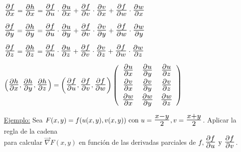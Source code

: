 \documentclass[10pt, titlepage]{article}
\newcommand{\bfrac}[2]{\scalebox{1.4}{$\frac{#1}{#2}$}}
\begin{document}
$\bfrac{\partial f}{\partial x} = \bfrac{\partial h}{\partial x} = \bfrac{\partial f}{\partial u} \cdot \bfrac{
\partial u}{\partial x} + \bfrac{\partial f}{\partial v} \cdot \bfrac{\partial v}{\partial x} + \bfrac{\partial f} 
{\partial w} \cdot \bfrac{\partial w}{\partial x}$
\vspace{3mm}

$\bfrac{\partial f}{\partial y} = \bfrac{\partial h}{\partial y} = \bfrac{\partial f}{\partial u} \cdot \bfrac{
\partial u}{\partial y} + \bfrac{\partial f}{\partial v} \cdot \bfrac{\partial v}{\partial y} + \bfrac{\partial f} 
{\partial w} \cdot \bfrac{\partial w}{\partial y}$
\vspace{3mm}

$\bfrac{\partial f}{\partial z} = \bfrac{\partial h}{\partial z} = \bfrac{\partial f}{\partial u} \cdot \bfrac{
\partial u}{\partial z} + \bfrac{\partial f}{\partial v} \cdot \bfrac{\partial v}{\partial z} + \bfrac{\partial f} 
{\partial w} \cdot \bfrac{\partial w}{\partial z}$
\vspace{5mm}

$\left ( \bfrac{\partial h}{\partial x}, \bfrac{\partial h}{\partial y}, \bfrac{\partial h}{\partial z} \right ) = 
\left ( \bfrac{\partial f}{\partial u}, \bfrac{\partial f}{\partial v}, \bfrac{\partial f}{\partial w} \right )
\left (\begin{array}{ccc}

\bfrac{\partial u}{\partial x} & \bfrac{\partial u}{\partial y} & \bfrac{\partial u}{\partial z}\vspace{1mm}\\
\bfrac{\partial v}{\partial x} & \bfrac{\partial v}{\partial y} & \bfrac{\partial v}{\partial z}\vspace{1mm}\\
\bfrac{\partial w}{\partial x} & \bfrac{\partial w}{\partial y} & \bfrac{\partial w}{\partial z}\\

\end{array} \right )
$
\vspace{5mm}

\underline{Ejemplo:} Sea $F (x, y) = f (u (x, y), v (x, y)) \text{ con } u = \bfrac{x - y}{2}, v = \bfrac{x + y}
{2}$. Aplicar la regla de la cadena \\ \indent para calcular $\vec{\nabla} F (x, y)$ en función de las 
derivadas parciales de $f, \bfrac{\partial f}{\partial u} \text{ y } \bfrac{\partial f}{\partial v}$.
\vspace{3mm}
\end{document}
